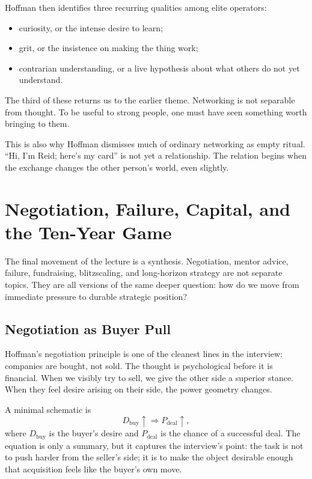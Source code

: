 Hoffman then identifies three recurring qualities among elite operators:
\begin{itemize}
\item curiosity, or the intense desire to learn;
\item grit, or the insistence on making the thing work;
\item contrarian understanding, or a live hypothesis about what others do not yet understand.
\end{itemize}
The third of these returns us to the earlier theme. Networking is not separable from thought. To be useful to strong people, one must have seen something worth bringing to them.

This is also why Hoffman dismisses much of ordinary networking as empty ritual. ``Hi, I'm Reid; here's my card'' is not yet a relationship. The relation begins when the exchange changes the other person's world, even slightly.

\section{Negotiation, Failure, Capital, and the Ten-Year Game}

The final movement of the lecture is a synthesis. Negotiation, mentor advice, failure, fundraising, blitzscaling, and long-horizon strategy are not separate topics. They are all versions of the same deeper question: how do we move from immediate pressure to durable strategic position?

\subsection{Negotiation as Buyer Pull}

Hoffman's negotiation principle is one of the cleanest lines in the interview: companies are bought, not sold. The thought is psychological before it is financial. When we visibly try to sell, we give the other side a superior stance. When they feel desire arising on their side, the power geometry changes.

A minimal schematic is
\begin{equation}
D_{\mathrm{buy}}\uparrow \Longrightarrow P_{\mathrm{deal}}\uparrow,
\end{equation}
where \(D_{\mathrm{buy}}\) is the buyer's desire and \(P_{\mathrm{deal}}\) is the chance of a successful deal. The equation is only a summary, but it captures the interview's point: the task is not to push harder from the seller's side; it is to make the object desirable enough that acquisition feels like the buyer's own move.

